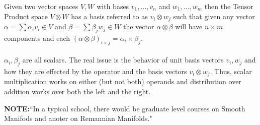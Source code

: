\documentclass[10pt,a4paper]{report}
\begin{document}
\begin{enumerate}
	Given two vector spaces $V, W$ with bases $v_1, \dots, v_n$ and $w_1, \dots, w_m$ then the Tensor Product space $V \otimes W$ has a basis referred to as $v_i \otimes w_j$ such that given any vector $\alpha = \sum \alpha_i v_i \in V$ and $\beta = \sum \beta_j w_j \in W$ the vector $\alpha \otimes \beta$ will have $n\times m$ components and each $(\alpha \otimes \beta)_{i\times j} = \alpha_i \times \beta_j$.\\
	\\
	$\alpha_i, \beta_j$ are all scalars.  The real issue is the behavior of unit basis vectors $v_i, w_j$ and how they are effected by the operator and the basis vectors $v_i \otimes w_j$.  Thus, scalar multiplication works on either (but not both) operands and distribution over addition works over both the left and the right.
\end{enumerate}

\noindent\textbf{NOTE:}``In a typical school, there would be graduate level courses on Smooth Manifods and anoter  on Remannian Manifolds."
\end{document}
